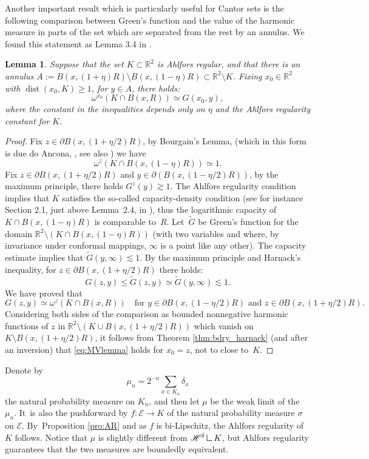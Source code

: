 \documentclass[10pt]{amsart}
\let\backslash\setminus
\let\sm\setminus
\let\wt\widetilde
\numberwithin{equation}{section}
\theoremstyle{plain}
\newtheorem{lem}{Lemma}[section]
\theoremstyle{definition}
\newcommand{\R}{\mathbb{R}}
\renewcommand{\H}{\mathscr{H}}
\DeclareMathOperator{\dist}{dist}
\newcommand{\cE}{{\mathcal E}}
\newcommand{\mres}{\mathbin{\vrule height 1.6ex depth 0pt width
0.13ex\vrule height 0.13ex depth 0pt width 1.3ex}}
\begin{document}
Another important result which is particularly useful for Cantor sets is the following comparison between Green's function and the value of the harmonic measure in parts of the set which are separated from the rest by an annulus. We found this statement as Lemma 3.4 in \cite{MakarovVolberg1986}.
\begin{lem}\label{lem:MV}
Suppose that the set $K\subset \R^2$ is Ahlfors regular, and that there is an annulus $ A:= B(x,(1+\eta) R)\backslash B(x,(1-\eta)R)\subset \R^2\backslash K$. Fixing $x_0\in \R^2$ with $\dist(x_0,K)\ge 1$, for $y\in A$, there holds:
\begin{equation}\label{eq:MVlemma}
\omega^{x_0}(K\cap B(x,R)) \simeq G(x_0, y),
\end{equation}
where the constant in the inequalities
depends only on $\eta$ and the Ahlfors regularity constant for
$K$.
\end{lem}
\begin{proof}
Fix $z\in \partial B(x,(1+\eta/2)R)$, by Bourgain's Lemma, (which in this form is due do Ancona, \cite[Lem.\,3]{Ancona1986Strong}, see also \cite[Lem.\,3.4]{AHMMMTV2016GAFA}) we have
\[
\omega^{z}(K\cap B(x,(1-\eta) R)) \simeq 1.
\]
Fix $z\in \partial B(x,(1+\eta/2)R)$ and $y\in \partial(B(x,(1-\eta/2)R))$, by the maximum principle, there holds $G^z(y)\gtrsim 1$. The Ahlfors regularity condition implies that $K$ satisfies the so-called capacity-density condition
(see for instance Section 2.1, just above Lemma~2.4, in \cite{Tolsa2023ADreg}),
thus the logarithmic capacity of $K\cap B(x,(1-\eta)R)$ is comparable to~$R$.
Let~$\wt G$ be Green's function for the domain $\R^2\sm (K\cap B(x,(1-\eta)R))$ (with two variables and where, by invariance
under conformal mappings, $\infty$ is a point like any other). The capacity estimate implies that
$\wt G (y,\infty) \lesssim 1$.
By the maximum principle and Harnack's inequality, for $z\in \partial B(x,(1+\eta/2)R)$ there holds:
\[
G(z,y)\le \wt G(z,y) \simeq \wt G(y, \infty) \lesssim 1.
\]
We have proved that
\[
G(z,y)\simeq \omega^{z}(K\cap B(x,R))\quad\text{for $y \in \partial B(x,(1-\eta/2)R)$ and $z\in \partial B(x,(1+\eta/2)R)$}.
\]
Considering both sides of the comparison as bounded nonnegative harmonic functions of $z$ in $\R^2\sm (K\cup B(x,(1+\eta/2)R))$ which vanish on $K\sm B(x,(1+\eta/2)R)$,
it follows from Theorem \ref{thm:bdry_harnack} (and after an inversion) that
\eqref{eq:MVlemma} holds for $x_0=z$, not to close to~$K$.
\end{proof}

Denote by
\begin{equation} \label{3b1}
\mu_n = 2^{-n} \sum_{x \in K_n} \delta_x
\end{equation}
the natural probability measure on $K_n$, and then let $\mu$ be the weak limit of the $\mu_n$.
It~is also the pushforward by $f : \cE \to K$ of the natural probability measure $\sigma$ on $\cE$. By~Proposition \ref{pro:AR} and as $f$ is bi-Lipschitz, the Ahlfors regularity of $K$ follows.
Notice that $\mu$ is slightly different from $\H^\delta \mres{K}$, but Ahlfors regularity guarantees that the two measures are boundedly equivalent.
\end{document}
